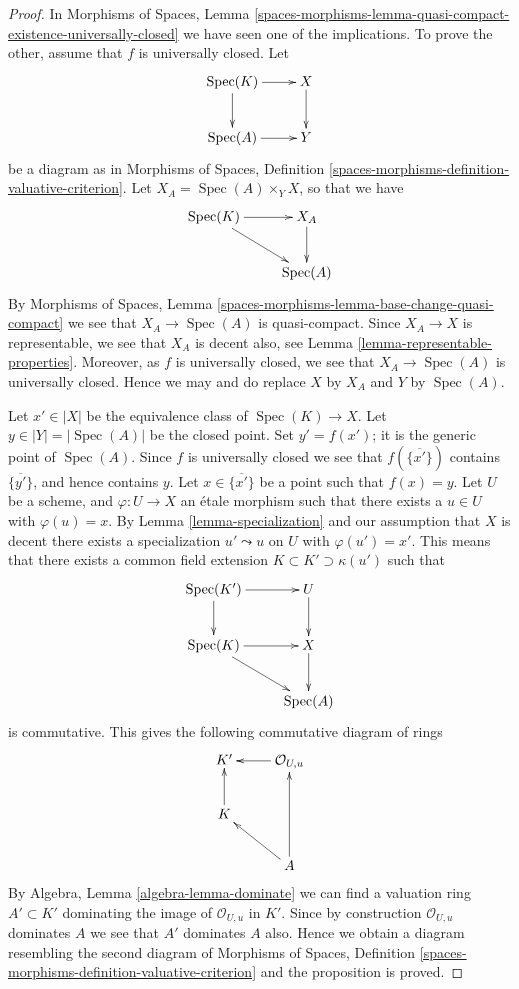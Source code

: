 \documentclass{stacks-project}
\theoremstyle{plain}
\theoremstyle{definition}
\theoremstyle{remark}
\numberwithin{equation}{subsection}
\def\Spec{\mathop{\mathrm{Spec}}}
\begin{document}
\begin{proof}
In
Morphisms of Spaces,
Lemma \ref{spaces-morphisms-lemma-quasi-compact-existence-universally-closed}
we have seen one of the implications.
To prove the other, assume that $f$ is universally closed. Let
$$
\xymatrix{
\Spec(K) \ar[r] \ar[d] & X \ar[d] \\
\Spec(A) \ar[r] & Y
}
$$
be a diagram as in
Morphisms of Spaces,
Definition \ref{spaces-morphisms-definition-valuative-criterion}.
Let $X_A = \Spec(A) \times_Y X$, so that we have
$$
\xymatrix{
\Spec(K) \ar[r] \ar[rd] & X_A \ar[d] \\
 & \Spec(A)
}
$$
By
Morphisms of Spaces,
Lemma \ref{spaces-morphisms-lemma-base-change-quasi-compact}
we see that $X_A \to \Spec(A)$ is quasi-compact. Since $X_A \to X$
is representable, we see that $X_A$ is decent also, see
Lemma \ref{lemma-representable-properties}.
Moreover, as $f$ is universally closed, we see that $X_A \to \Spec(A)$
is universally closed.
Hence we may and do replace $X$ by $X_A$ and $Y$ by $\Spec(A)$.

\medskip\noindent
Let $x' \in |X|$ be the equivalence class of
$\Spec(K) \to X$. Let $y \in |Y| = |\Spec(A)|$ be
the closed point. Set $y' = f(x')$; it is the generic point of
$\Spec(A)$. Since $f$ is universally closed we see that
$f(\overline{\{x'\}})$ contains $\overline{\{y'\}}$, and hence
contains $y$. Let $x \in \overline{\{x'\}}$ be a point such that
$f(x) = y$. Let $U$ be a scheme, and $\varphi : U \to X$
an \'etale morphism such that there exists a $u \in U$ with
$\varphi(u) = x$. By
Lemma \ref{lemma-specialization}
and our assumption that $X$ is decent
there exists a specialization $u' \leadsto u$ on $U$ with $\varphi(u') = x'$.
This means that there exists a common field extension
$K \subset K' \supset \kappa(u')$ such that
$$
\xymatrix{
\Spec(K') \ar[r] \ar[d] & U \ar[d] \\
\Spec(K) \ar[r] \ar[rd] & X \ar[d] \\
 & \Spec(A)
}
$$
is commutative. This gives the following commutative diagram of rings
$$
\xymatrix{
K' & \mathcal{O}_{U, u} \ar[l] \\
K \ar[u] & \\
 & A \ar[lu] \ar[uu]
}
$$
By
Algebra, Lemma \ref{algebra-lemma-dominate}
we can find a valuation ring $A' \subset K'$ dominating the image of
$\mathcal{O}_{U, u}$ in $K'$. Since by construction $\mathcal{O}_{U, u}$
dominates $A$ we see that $A'$ dominates $A$ also. Hence we obtain a diagram
resembling the second diagram of
Morphisms of Spaces,
Definition \ref{spaces-morphisms-definition-valuative-criterion}
and the proposition is proved.
\end{proof}
\end{document}
